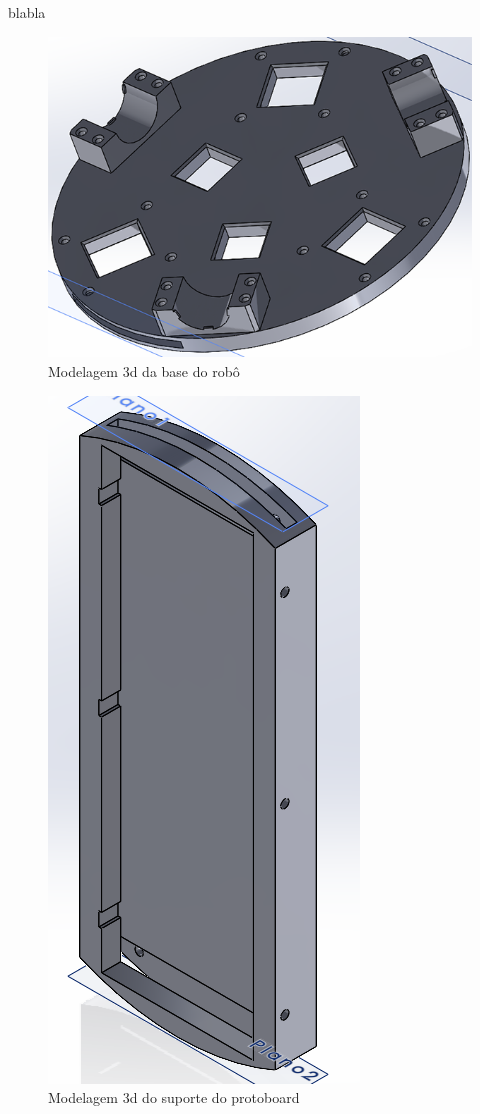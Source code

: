 blabla

\begin{figure}[h]
	\centering
	\includegraphics{figures/3d_1}
	\caption{Modelagem 3d da base do robô}
	\label{fig:base_robo_3d}
\end{figure}

\begin{figure}[h]
	\centering
	\includegraphics{figures/3d_2}
	\caption{Modelagem 3d do suporte do protoboard}
	\label{fig:suport_protoboard_3d}
\end{figure}


